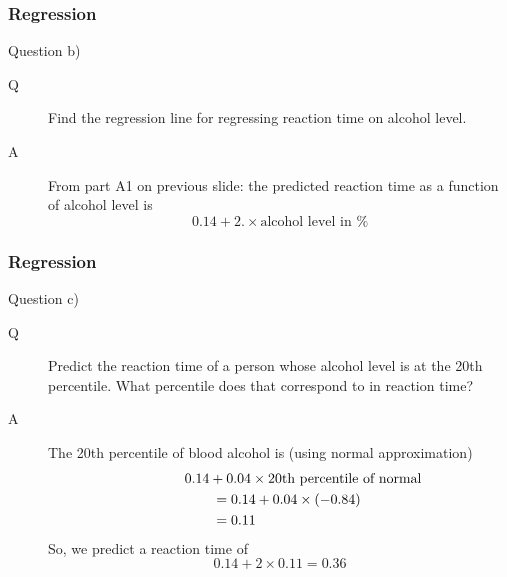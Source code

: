 \documentclass[handout]{beamer}
\begin{document}

   \begin{frame} \frametitle{Regression}

   \begin{block}
   {Question b)}
   \begin{description}
   \item[Q] Find the regression line for regressing
   reaction time on alcohol level.
   \item[A] From part A1 on previous slide:
   the predicted reaction time as a function of alcohol level is
   $$
   0.14 + 2. \times \text{alcohol level in \%}
   $$
   \end{description}
   \end{block}
   \end{frame}


   \begin{frame} \frametitle{Regression}

   \begin{block}
   {Question c)}
   \begin{description}
   \item[Q] Predict the reaction time of a person
   whose alcohol level is at the 20th percentile. What percentile
   does that correspond to in reaction time?
   \item[A] The 20th percentile of blood alcohol is (using normal approximation)
   $$
   \begin{aligned}
   \lefteqn{0.14 + 0.04 \times \text{20th percentile of normal}} \\
   & \qquad = 0.14 + 0.04 \times (-0.84) \\
   & \qquad = 0.11
   \end{aligned}
   $$
   So, we predict a reaction time of
   $$
   0.14 + 2 \times 0.11 = 0.36
   $$
   \end{description}
   \end{block}
   \end{frame}

\end{document}
